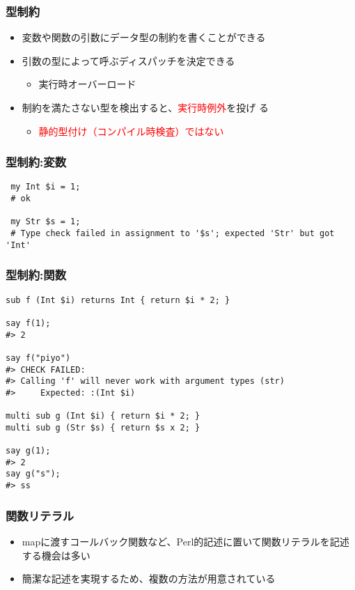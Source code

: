 \documentclass[14pt,dvipdfm,trans]{beamer}
\begin{document}
\begin{frame}
 \frametitle{型制約}
\begin{itemize}
 \item 変数や関数の引数にデータ型の制約を書くことができる
       \vspace*{1zh}
 \item 引数の型によって呼ぶディスパッチを決定できる
       \begin{itemize}
	\item 実行時オーバーロード
       \end{itemize}
       \vspace*{1zh}
 \item 制約を満たさない型を検出すると、\textcolor{red}{実行時例外}を投げ
       る
       \begin{itemize}
	\item \textcolor{red}{静的型付け（コンパイル時検査）ではない}
       \end{itemize}
\end{itemize}
\end{frame}

\begin{frame}[fragile]
 \frametitle{型制約:変数}
\begin{lstlisting}
 my Int $i = 1;
 # ok

 my Str $s = 1;
 # Type check failed in assignment to '$s'; expected 'Str' but got 'Int'
\end{lstlisting}
\end{frame}

\begin{frame}[fragile]
 \frametitle{型制約:関数}
\begin{lstlisting}
sub f (Int $i) returns Int { return $i * 2; }

say f(1);
#> 2

say f("piyo")
#> CHECK FAILED:
#> Calling 'f' will never work with argument types (str)
#>     Expected: :(Int $i) 

multi sub g (Int $i) { return $i * 2; }
multi sub g (Str $s) { return $s x 2; }

say g(1);
#> 2
say g("s");
#> ss
\end{lstlisting}
\end{frame}

\begin{frame}
 \frametitle{関数リテラル}
 \begin{itemize}
  \item mapに渡すコールバック関数など、Perl的記述に置いて関数リテラルを記述する機会は多い
  \item 簡潔な記述を実現するため、複数の方法が用意されている
 \end{itemize}
\end{frame}
\end{document}
